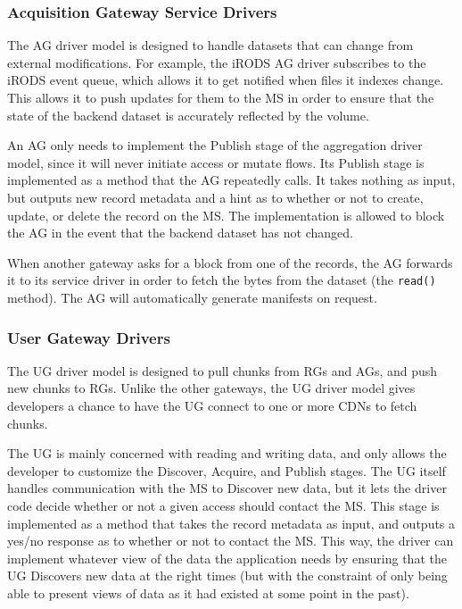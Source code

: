 \subsubsection{Acquisition Gateway Service Drivers}

The AG driver model is designed to handle datasets that can change from
external modifications.  For example, the iRODS AG driver
subscribes to the iRODS event queue, which allows it to get notified
when files it indexes change.  This allows it to push updates for them to the MS
in order to ensure that the state of the backend dataset is accurately reflected
by the volume.

 An AG only needs to implement the Publish stage of
the aggregation driver model, since it will never initiate access or mutate
flows.  Its Publish stage is implemented as a method that the AG repeatedly
calls.  It takes nothing as input, but outputs new record metadata and a
hint as to whether or not to create, update, or delete the record on the MS.  The
implementation is allowed to block the AG in the event that the backend dataset
has not changed.

 When another gateway asks for a block from
one of the records, the AG forwards it to its service driver in order to fetch
the bytes from the dataset (the \texttt{read()} method).  The AG will
automatically generate manifests on request.

\subsubsection{User Gateway Drivers}

The UG driver model is designed to pull chunks from RGs and AGs, and push new
chunks to RGs.  Unlike the other gateways, the UG driver model gives developers
a chance to have the UG connect to one or more CDNs to fetch chunks.

  The UG is mainly concerned with reading
and writing data, and only allows the developer to customize the Discover, Acquire, and
Publish stages.  The UG itself handles communication with the MS to Discover new data,
but it lets the driver code decide whether or not a given access should contact
the MS.  This stage is implemented as a method that takes the record metadata as
input, and outputs a yes/no response as to whether or not to contact the MS.
This way, the driver can implement
whatever view of the data the application needs by ensuring that the UG
Discovers new data at the right times (but with the constraint of only being
able to present views of data as it had existed at some point in the past).

